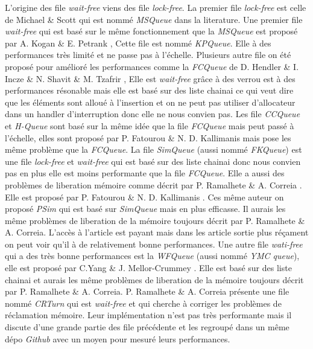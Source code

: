 L'origine des file \emph{wait-free} viens des file \emph{lock-free}.
La premier file \emph{lock-free} est celle de Michael \& Scott \cite{MICHAEL19981} qui est nommé \emph{MSQueue} dans la literature.
Une premier file \emph{wait-free} qui est basé sur le même fonctionnement que la \emph{MSQueue} est proposé par A. Kogan \& E. Petrank \cite{10.1145/1941553.1941585},
Cette file est nommé \emph{KPQueue}. Elle à des performances très limité et ne passe pas à l'échelle.
Plusieurs autre file on été proposé pour amélioré les performances comme la \emph{FCQueue} de D. Hendler \& I. Incze \& N. Shavit \& M. Tzafrir \cite{10.1145/1810479.1810540},
Elle est \emph{wait-free} grâce à des verrou est à des performances résonable mais elle est basé sur des liste chainai ce qui veut dire que les éléments sont alloué à l'insertion
et on ne peut pas utiliser d'allocateur dans un handler d'interruption donc elle ne nous convien pas.
Les file \emph{CCQueue} et \emph{H-Queue} sont basé sur la même idée que la file \emph{FCQueue} mais peut passé à l'échelle,
elles sont proposé par P. Fatourou \& N. D. Kallimanis \cite{10.1145/2370036.2145849} mais pose les même problème que la \emph{FCQueue}.
La file \emph{SimQueue} (aussi nommé \emph{FKQueue}) est une file \emph{lock-free} et \emph{wait-free} qui est basé sur des liste chainai
donc nous convien pas en plus elle est moins performante que la file \emph{FCQueue}.
Elle a aussi des problèmes de liberation mémoire comme décrit par P. Ramalhete \& A. Correia \cite{10.1145/3155284.3019022}.
Elle est proposé par P. Fatourou \& N. D. Kallimanis \cite{10.1145/1989493.1989549}.
Ces même auteur on proposé \emph{PSim} \cite{Fatourou2014} qui est basé sur \emph{SimQueue} mais en plus efficasse.
Il aurais les même problèmes de liberation de la mémoire toujours décrit par P. Ramalhete \& A. Correia.
L'accès à l'article est payant mais dans les article sortie plus réçament on peut voir qu'il à de relativement bonne performances.
Une autre file \emph{wati-free} qui a des très bonne performances est la \emph{WFQueue} (aussi nommé \emph{YMC queue}),
elle est proposé par C.Yang \& J. Mellor-Crummey \cite{10.1145/3016078.2851168}.
Elle est basé sur des liste chainai et aurais les même problèmes de liberation de la mémoire toujours décrit par P. Ramalhete \& A. Correia.
P. Ramalhete \& A. Correia présente une file nommé \emph{CRTurn} \cite{10.1145/3155284.3019022} qui est \emph{wait-free} et qui cherche à corriger les problèmes de réclamation mémoire.
Leur implémentation n'est pas très performante mais il discute d'une grande partie des file précédente et les regroupé dans un même dépo \emph{Github} avec un moyen pour mesuré leurs performances.
